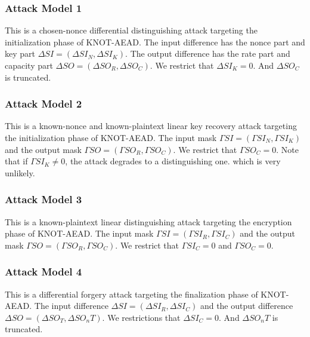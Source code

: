 \subsubsection{Attack Model 1}
This is a chosen-nonce differential distinguishing attack targeting the initialization phase of KNOT-AEAD. The input difference has the nonce part and key part $\Delta SI=(\Delta SI_N,\Delta SI_K)$. The output difference has the rate part and capacity part $\Delta SO=(\Delta SO_R,\Delta SO_C)$. We restrict that $\Delta SI_K=0$. And $\Delta SO_C$ is truncated. 

\subsubsection{Attack Model 2}
This is a known-nonce and known-plaintext linear key recovery attack targeting the initialization phase of KNOT-AEAD. The input mask $\Gamma SI=(\Gamma SI_N,\Gamma SI_K)$ and the output mask $\Gamma SO=(\Gamma SO_R,\Gamma SO_C)$. We restrict that $\Gamma SO_C=0$. Note that if $\Gamma SI_K\neq 0$, the attack degrades to a distinguishing one. which is very unlikely. 


\subsubsection{Attack Model 3}
This is a known-plaintext linear distinguishing attack targeting the encryption phase of KNOT-AEAD. The input mask $\Gamma SI=(\Gamma SI_R,\Gamma SI_C)$ and the output mask $\Gamma SO=(\Gamma SO_R,\Gamma SO_C)$. We restrict that $\Gamma SI_C=0$ and $\Gamma SO_C=0$. 

\subsubsection{Attack Model 4}
This is a differential forgery attack targeting the finalization phase of KNOT-AEAD. The input difference $\Delta SI=(\Delta SI_R,\Delta SI_C)$ and the output difference $\Delta SO=(\Delta SO_T,\Delta SO_nT)$. We restrictions that $\Delta SI_C=0$. And $\Delta SO_nT$ is truncated. 


